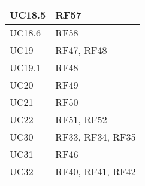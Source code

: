 \begin{center}
\begin{longtable}{|C{5cm}|C{5cm}|}
    UC18.5 & RF57 \\
    \hline
    UC18.6 & RF58 \\
    \hline
    UC19 & RF47, RF48 \\
    \hline
    UC19.1 & RF48 \\
    \hline
    UC20 & RF49 \\
    \hline
    UC21 & RF50 \\
    \hline
    UC22 & RF51, RF52 \\
    \hline
    UC30 & RF33, RF34, RF35 \\
    \hline
    UC31 & RF46 \\
    \hline
    UC32 & RF40, RF41, RF42 \\
    \hline
\end{longtable}
\end{center}

